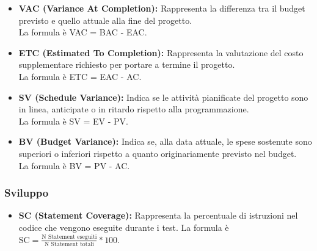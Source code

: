 \begin{itemize}
    \item \textbf{VAC (Variance At Completion):} Rappresenta la differenza tra il budget previsto e quello attuale alla fine del progetto.\\
    La formula è VAC = BAC - EAC.
    \item \textbf{ETC (Estimated To Completion):} Rappresenta la valutazione del costo supplementare richiesto per portare a termine il progetto.\\
    La formula è ETC = EAC - AC.
    \item \textbf{SV (Schedule Variance):} Indica se le attività pianificate del progetto sono in linea, anticipate o in ritardo rispetto alla programmazione.\\
    La formula è SV = EV - PV.
    \item \textbf{BV (Budget Variance):} Indica se, alla data attuale, le spese sostenute sono superiori o inferiori rispetto a quanto originariamente previsto nel budget.\\
    La formula è BV = PV - AC.
\end{itemize}
\newpage
\subsubsection{Sviluppo}
\begin{itemize}
    \item \textbf{SC (Statement Coverage):} Rappresenta la percentuale di istruzioni nel codice che vengono eseguite durante i test.
    La formula è \( \text{SC} = \frac{\text{N Statement eseguiti}}{\text{N Statement totali}}*100 \).
\end{itemize}

